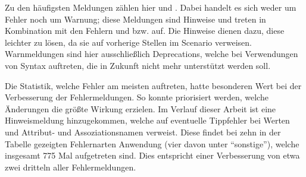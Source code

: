 Zu den häufigsten Meldungen zählen hier  und .
Dabei handelt es sich weder um Fehler noch um Warnung;
diese Meldungen sind Hinweise und treten in Kombination mit den Fehlern  und  bzw.  auf.
Die Hinweise dienen dazu, diese leichter zu lösen, da sie auf vorherige Stellen im Scenario verweisen.
Warnmeldungen sind hier ausschließlich Deprecations, welche bei Verwendungen von Syntax auftreten, die in Zukunft nicht mehr unterstützt werden soll.

Die Statistik, welche Fehler am meisten auftreten, hatte besonderen Wert bei der Verbesserung der Fehlermeldungen.
So konnte priorisiert werden, welche Änderungen die größte Wirkung erzielen.
Im Verlauf dieser Arbeit ist eine Hinweismeldung hinzugekommen, welche auf eventuelle Tippfehler bei Werten und Attribut- und Assoziationsnamen verweist.
Diese findet bei zehn in der Tabelle gezeigten Fehlernarten Anwendung (vier davon unter ``sonstige''),
welche insgesamt 775 Mal aufgetreten sind.
Dies entspricht einer Verbesserung von etwa zwei dritteln aller Fehlermeldungen.
